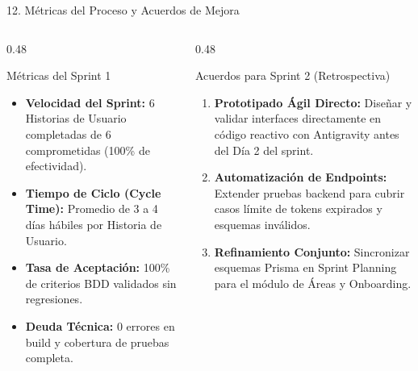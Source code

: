 \documentclass[aspectratio=169, 10pt, spanish]{beamer}
\begin{document}
\begin{frame}{12. Métricas del Proceso y Acuerdos de Mejora}
\begin{columns}[T]
    \begin{column}{0.48\textwidth}
        \begin{academicbox}{Métricas del Sprint 1}
            \scriptsize
            \begin{itemize}
                \item \textbf{Velocidad del Sprint:} 6 Historias de Usuario completadas de 6 comprometidas (100\% de efectividad).
                \item \textbf{Tiempo de Ciclo (Cycle Time):} Promedio de 3 a 4 días hábiles por Historia de Usuario.
                \item \textbf{Tasa de Aceptación:} 100\% de criterios BDD validados sin regresiones.
                \item \textbf{Deuda Técnica:} 0 errores en build y cobertura de pruebas completa.
            \end{itemize}
        \end{academicbox}
    \end{column}
    \begin{column}{0.48\textwidth}
        \begin{formalbox}{Acuerdos para Sprint 2 (Retrospectiva)}
            \scriptsize
            \begin{enumerate}
                \item \textbf{Prototipado Ágil Directo:} Diseñar y validar interfaces directamente en código reactivo con Antigravity antes del Día 2 del sprint.
                \item \textbf{Automatización de Endpoints:} Extender pruebas backend para cubrir casos límite de tokens expirados y esquemas inválidos.
                \item \textbf{Refinamiento Conjunto:} Sincronizar esquemas Prisma en Sprint Planning para el módulo de Áreas y Onboarding.
            \end{enumerate}
        \end{formalbox}
    \end{column}
\end{columns}
\end{frame}
\end{document}
